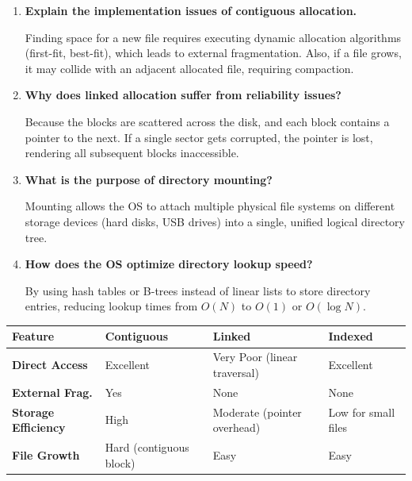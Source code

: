 \documentclass[12pt,a4paper]{article}
\newcommand{\Q}[1]{\textbf{#1}\par\noindent\ignorespaces}
\renewcommand{\arraystretch}{1.45}
\begin{document}
\begin{tcolorbox}[exambox, title={\textbf{Frequently Asked / Viva Questions}}]
\begin{enumerate}[topsep=0pt, label=\textbf{Q\arabic*.}, itemsep=5pt]
  \item \Q{Explain the implementation issues of contiguous allocation.}
    Finding space for a new file requires executing dynamic allocation algorithms (first-fit, best-fit), which leads to external fragmentation. Also, if a file grows, it may collide with an adjacent allocated file, requiring compaction.
  \item \Q{Why does linked allocation suffer from reliability issues?}
    Because the blocks are scattered across the disk, and each block contains a pointer to the next. If a single sector gets corrupted, the pointer is lost, rendering all subsequent blocks inaccessible.
  \item \Q{What is the purpose of directory mounting?}
    Mounting allows the OS to attach multiple physical file systems on different storage devices (hard disks, USB drives) into a single, unified logical directory tree.
  \item \Q{How does the OS optimize directory lookup speed?}
    By using hash tables or B-trees instead of linear lists to store directory entries, reducing lookup times from $O(N)$ to $O(1)$ or $O(\log N)$.
\end{enumerate}
\end{tcolorbox}

\begin{tcolorbox}[tikzbox, title={File Allocation Methods Comparison}]
\renewcommand{\arraystretch}{1.4}
\par\noindent
\begin{tabularx}{\linewidth}{|B{2.2cm}|>{\small\centering\arraybackslash}X|>{\small\centering\arraybackslash}X|>{\small\centering\arraybackslash}X|}
\hline
\textbf{Feature} & \textbf{\color{myred}Contiguous} & \textbf{\color{myteal}Linked} & \textbf{\color{myamber}Indexed} \\
\hline
\textbf{Direct Access} & Excellent & Very Poor (linear traversal) & Excellent \\
\hline
\textbf{External Frag.} & Yes & None & None \\
\hline
\textbf{Storage Efficiency} & High & Moderate (pointer overhead) & Low for small files \\
\hline
\textbf{File Growth} & Hard (contiguous block) & Easy & Easy \\
\hline
\end{tabularx}
\end{tcolorbox}
\end{document}
